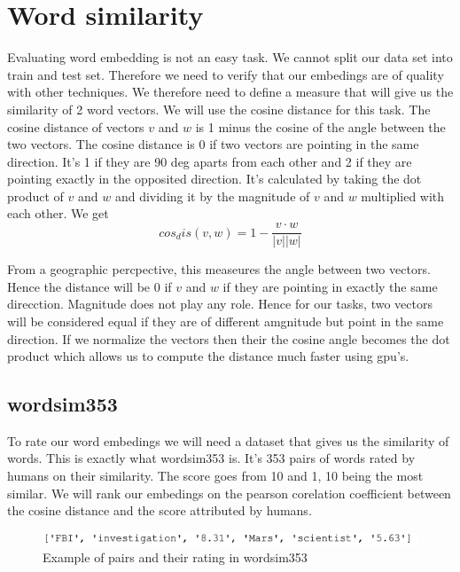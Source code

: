 \section{Word similarity}
Evaluating word embedding is not an easy task. We cannot split our data set into train and test set. Therefore we need to verify that our embedings are of quality with other techniques. We therefore need to define a measure that will give us the similarity of 2 word vectors. We will use the cosine distance for this task. The cosine distance of vectors $v$ and $w$ is 1 minus the cosine of the angle between the two vectors. The cosine distance is 0 if two vectors are pointing in the same direction. It's 1 if they are 90 deg aparts from each other and 2 if they are pointing exactly in the opposited direction. It's calculated by taking the dot product of $v$ and $w$ and dividing it by the magnitude of $v$ and $w$ multiplied with each other. We get
\begin{equation}
cos_dis(v,w) =1 - \frac{v \cdot w}{|v| |w|} 
\end{equation}

From a geographic percpective, this measeures the angle between two vectors. Hence the distance will be 0 if $v$ and $w$  if they are pointing in exactly the same direcction. Magnitude does not play any role. Hence for our tasks, two vectors will be considered equal if they are of different amgnitude but point in the same direction. 
If we normalize the vectors then their the cosine angle becomes the dot product which allows us to compute the distance much faster using gpu's. 


\subsection{wordsim353}
To rate our word embedings we will need a dataset that gives us the similarity of words. This is exactly what wordsim353 is. It's 353 pairs of words rated by humans on their similarity. The score goes from 10 and 1, 10 being the most similar. We will rank our embedings on the pearson corelation coefficient between the cosine distance and the score attributed by humans. 
\begin{figure}[ht]
    \centering
			\includegraphics[scale=0.7]{images/wordsim353_example} 
    \caption{Example of pairs and their rating in wordsim353}
    \label{fig:efficient}
\end{figure}

